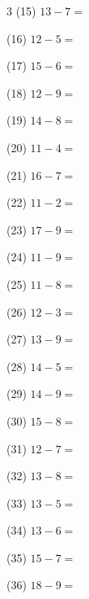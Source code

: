 \documentclass[a4paper, 11pt]{ltjsarticle}
\begin{document}
\begin{multicols*}{3}
\noindent (15) \quad $13 - 7 =$
\vspace*{\fill}

\noindent (16) \quad $12 - 5 =$
\vspace*{\fill}

\noindent (17) \quad $15 - 6 =$
\vspace*{\fill}

\noindent (18) \quad $12 - 9 =$
\vspace*{\fill}

\noindent (19) \quad $14 - 8 =$
\vspace*{\fill}

\noindent (20) \quad $11 - 4 =$
\vspace*{\fill}

\noindent (21) \quad $16 - 7 =$
\vspace*{\fill}

\noindent (22) \quad $11 - 2 =$
\vspace*{\fill}

\noindent (23) \quad $17 - 9 =$
\vspace*{\fill}

\noindent (24) \quad $11 - 9 =$
\vspace*{\fill}
\columnbreak

\noindent (25) \quad $11 - 8 =$
\vspace*{\fill}

\noindent (26) \quad $12 - 3 =$
\vspace*{\fill}

\noindent (27) \quad $13 - 9 =$
\vspace*{\fill}

\noindent (28) \quad $14 - 5 =$
\vspace*{\fill}

\noindent (29) \quad $14 - 9 =$
\vspace*{\fill}

\noindent (30) \quad $15 - 8 =$
\vspace*{\fill}

\noindent (31) \quad $12 - 7 =$
\vspace*{\fill}

\noindent (32) \quad $13 - 8 =$
\vspace*{\fill}

\noindent (33) \quad $13 - 5 =$
\vspace*{\fill}

\noindent (34) \quad $13 - 6 =$
\vspace*{\fill}

\noindent (35) \quad $15 - 7 =$
\vspace*{\fill}

\noindent (36) \quad $18 - 9 =$
\vspace*{\fill}

\end{multicols*}
\end{document}
